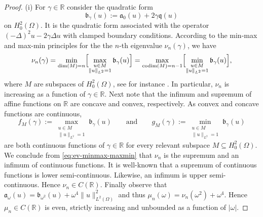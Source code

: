 \documentclass[a4paper, reqno,titlepage]{amsart}
\numberwithin{equation}{section}
\theoremstyle{plain}
\theoremstyle{definition}
\theoremstyle{remark}
\DeclareMathOperator{\codim}{codim}
\newcommand{\mfra}{\mathfrak{a}}
\newcommand{\mfrb}{\mathfrak{b}}
\newcommand{\mfrq}{\mathfrak{q}}
\newcommand{\RR}{\mathbb{R}}
\begin{document}
\begin{proof}
  (i) For $\gamma\in\RR$ consider the quadratic form
  \begin{equation*}
    \mfrb_\gamma(u) := \mfra_0(u)+ 2 \gamma\mfrq(u)
  \end{equation*}
  on $H_0^2(\Omega)$. It is the quadratic form associated with the operator $(-\Delta)^2 u-2\gamma\Delta u$ with clamped boundary conditions. According to the min-max and max-min principles for the the $n$-th eigenvalue $\nu_n(\gamma)$, we have
  \begin{equation}
    \label{eq:ev-minmax-maxmin}
    \nu_n(\gamma)
    =\min_{\dim(M)=n}\Bigl[\max_{\substack{u\in M\\\|u\|_{L^2}=1}}\mfrb_\gamma(u)\Bigr]
    =\max_{\codim(M)=n-1}\Bigl[\min_{\substack{u\in M\\\|u\|_{L^2}=1}}\mfrb_\gamma(u)\Bigr],
  \end{equation}
  where $M$ are subspaces of $H_0^2(\Omega)$, see for instance \cite[Chapters~2 and~3]{WS72}. In particular, $\nu_n$ is increasing as a function of $\gamma\in\RR$. Next note that the infimum and supremum of affine functions on $\RR$ are concave and convex, respectively. As convex and concave functions are continuous,
  \begin{equation*}
    f_M(\gamma):=\max_{\substack{u\in M\\\|u\|_{L^2}=1}}\mfrb_\gamma(u)
    \qquad\text{and}\qquad
    g_M(\gamma):=\min_{\substack{u\in M\\\|u\|_{L^2}=1}}\mfrb_\gamma(u)
  \end{equation*}
  are both continuous functions of $\gamma\in\RR$ for every relevant subspace $M\subseteq H_0^2(\Omega)$. We conclude from \eqref{eq:ev-minmax-maxmin} that $\nu_n$ is the supremum and an infimum of continuous functions. It is well-known that a supremum of continuous functions is lower semi-continuous. Likewise, an infimum is upper semi-continuous. Hence $\nu_n\in C(\RR)$. Finally observe that $\mfra_\omega(u)=\mfrb_{\omega^2}(u)+\omega^4\|u\|_{L^2(\Omega)}^2$ and thus $\mu_n(\omega)=\nu_n(\omega^2)+\omega^4$. Hence $\mu_n\in C(\RR)$ is even, strictly increasing and unbounded as a function of $|\omega|$.


\end{proof}
\end{document}
